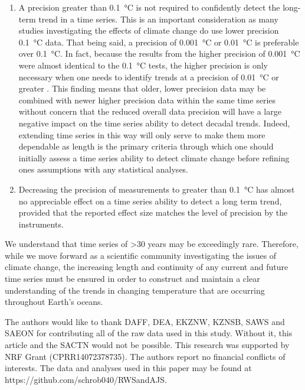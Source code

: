 \documentclass{ametsoc}
\begin{document}
\begin{enumerate}
\item A precision greater than \SI{0.1}{\degreeCelsius} is not required to confidently detect the long-term trend in a time series. This is an important consideration as many studies investigating the effects of climate change \citep[e.g.][]{Grant2010, Scherrer2010, Lathlean2012} do use lower precision \SI{0.1}{\degreeCelsius} data. That being said, a precision of \SI{0.001}{\degreeCelsius} or \SI{0.01}{\degreeCelsius} is preferable over \SI{0.1}{\degreeCelsius}. In fact, because the results from the higher precision of \SI{0.001}{\degreeCelsius} were almost identical to the \SI{0.1}{\degreeCelsius} tests, the higher precision is only necessary when one needs to identify trends at a precision of \SI{0.01}{\degreeCelsius} or greater \citep{Karl2015}. This finding means that older, lower precision data may be combined with newer higher precision data within the same time series without concern that the reduced overall data precision will have a large negative impact on the time series ability to detect decadal trends. Indeed, extending time series in this way will only serve to make them more dependable as length is the primary criteria through which one should initially assess a time series ability to detect climate change before refining ones assumptions with any statistical analyses.

\item Decreasing the precision of measurements to greater than \SI{0.1}{\degreeCelsius} has almost no appreciable effect on a time series ability to detect a long term trend, provided that the reported effect size matches the level of precision by the instruments.
\end{enumerate}

We understand that time series of >30 years may be exceedingly rare. Therefore, while we move forward as a scientific community investigating the issues of climate change, the increasing length and continuity of any current and future time series must be ensured in order to construct and maintain a clear understanding of the trends in changing temperature that are occurring throughout Earth's oceans.

%

\acknowledgments
The authors would like to thank DAFF, DEA, EKZNW, KZNSB, SAWS and SAEON for contributing all of the raw data used in this study. Without it, this article and the SACTN would not be possible. This research was supported by NRF Grant (CPRR14072378735). The authors report no financial conflicts of interests. The data and analyses used in this paper may be found at https://github.com/schrob040/RWSandAJS.
\end{document}
